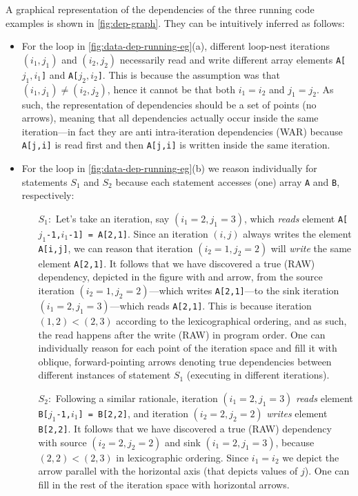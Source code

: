\documentclass[acmsmall,review]{acmart}\settopmatter{printfolios=true,printccs=false,printacmref=false}
\begin{document}
A graphical representation of the dependencies of the three running code
examples is shown in \cref{fig:dep-graph}.   They can be intuitively inferred 
as follows:
\begin{itemize}
    \item For the loop in \cref{fig:data-dep-running-eg}(a), different
loop-nest iterations $(i_1,j_1)$ and $(i_2,j_2)$ necessarily read and write 
different array elements {\tt A[$j_1,i_1$]} and {\tt A[$j_2,i_2$]}.
This is because the assumption was that $(i_1,j_1) \neq (i_2,j_2)$, 
hence it cannot be that both $i_1 = i_2$ and $j_1 = j_2$. As such,
the representation of dependencies should be a set of points (no arrows), 
meaning that all dependencies actually occur inside the same 
iteration---in fact they are anti intra-iteration dependencies (WAR) 
because {\tt A[j,i]} is read first and then {\tt A[j,i]} is written 
inside the same iteration.
    \item For the loop in \cref{fig:data-dep-running-eg}(b) we reason
        individually for statements $S_1$ and $S_2$ because each
        statement accesses (one) array {\tt A} and {\tt B}, respectively:
        \begin{itemize}
            \item[$S_1:$] Let's take an iteration, say $(i_1=2, j_1=3)$,
                which \emph{reads} element {\tt A[$j_1$-1,$i_1$-1] = A[2,1]}. 
                Since an iteration $(i,j)$ always writes the element 
                {\tt A[i,j]}, we can reason that iteration $(i_2=1, j_2=2)$ 
                will \emph{write} the same element {\tt A[2,1]}. 
                It follows that we have discovered a true (RAW) dependency, 
                depicted in the figure with and arrow, from the source 
                iteration $(i_2=1, j_2=2)$---which writes {\tt A[2,1]}---to 
                the sink iteration $(i_1=2, j_1=3)$---which reads {\tt A[2,1]}. 
                This is because iteration $(1,2) < (2,3)$ according to the 
                lexicographical ordering, and as such, the read happens after 
                the write (RAW) in program order. One can individually reason
                for each point of the iteration space and fill it with oblique,
                forward-pointing arrows denoting true dependencies between 
                different instances of statement $S_1$ 
                (executing in different iterations).
            \item[$S_2:$] Following a similar rationale, iteration $(i_1=2, j_1=3)$
                \emph{reads} element {\tt B[$j_1$-1,$i_1$] = B[2,2]}, and 
                iteration $(i_2=2, j_2=2)$ \emph{writes} element {\tt B[2,2]}.
                It follows that we have discovered a true (RAW) dependency
                with source $(i_2=2, j_2=2)$ and sink $(i_1=2, j_1=3)$,
                because $(2,2) < (2,3)$ in lexicographic ordering.
                Since $i_1=i_2$ we depict the arrow parallel with the
                horizontal axis (that depicts values of $j$). One can
                fill in the rest of the iteration space with horizontal arrows. 
        \end{itemize}


\end{itemize}
\end{document}
